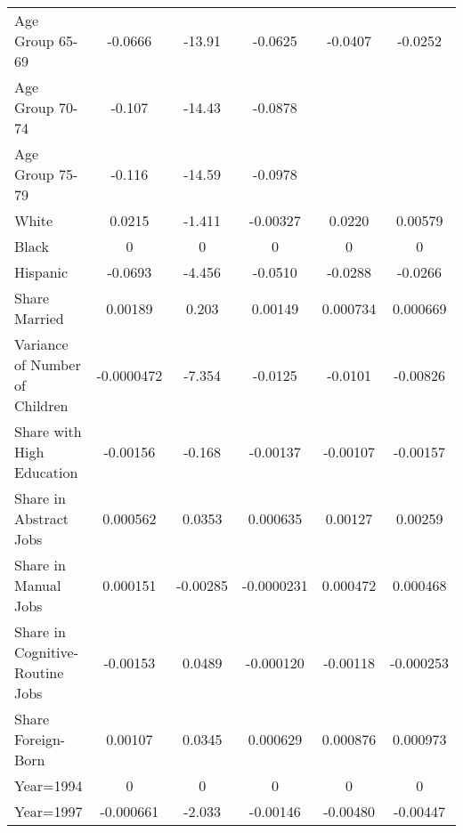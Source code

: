 \begin{table}[htbp]
\begin{tabular}{l*{5}{c}}
Age Group 65-69     &     -0.0666\sym{*}  &      -13.91\sym{***}&     -0.0625\sym{***}&     -0.0407\sym{*}  &     -0.0252         \\
Age Group 70-74     &      -0.107\sym{***}&      -14.43\sym{***}&     -0.0878\sym{***}&                     &                     \\
Age Group 75-79     &      -0.116\sym{***}&      -14.59\sym{***}&     -0.0978\sym{***}&                     &                     \\
White               &      0.0215         &      -1.411         &    -0.00327         &      0.0220\sym{*}  &     0.00579         \\
Black               &           0         &           0         &           0         &           0         &           0         \\
Hispanic            &     -0.0693         &      -4.456\sym{*}  &     -0.0510\sym{**} &     -0.0288         &     -0.0266         \\
Share Married       &     0.00189\sym{***}&       0.203\sym{***}&     0.00149\sym{***}&    0.000734\sym{*}  &    0.000669\sym{*}  \\
Variance of Number of Children&  -0.0000472         &      -7.354\sym{***}&     -0.0125         &     -0.0101         &    -0.00826         \\
Share with High Education&    -0.00156         &      -0.168\sym{**} &    -0.00137\sym{**} &    -0.00107         &    -0.00157\sym{*}  \\
Share in Abstract Jobs&    0.000562         &      0.0353         &    0.000635\sym{*}  &     0.00127\sym{*}  &     0.00259\sym{***}\\
Share in Manual Jobs&    0.000151         &    -0.00285         &  -0.0000231         &    0.000472         &    0.000468         \\
Share in Cognitive-Routine Jobs&    -0.00153\sym{*}  &      0.0489         &   -0.000120         &    -0.00118\sym{*}  &   -0.000253         \\
Share Foreign-Born  &     0.00107         &      0.0345         &    0.000629         &    0.000876\sym{*}  &    0.000973\sym{*}  \\
Year=1994           &           0         &           0         &           0         &           0         &           0         \\
Year=1997           &   -0.000661         &      -2.033\sym{***}&    -0.00146         &    -0.00480         &    -0.00447         \\

\end{tabular}
\end{table}
